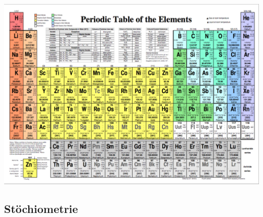 \documentclass[12pt,a4paper]{article}
\renewcommand{\=}[1]{\stackrel{#1}{=}}
\theoremstyle{definition}
\theoremstyle{remark}
\begin{document}
\includegraphics[width=0.9\textheight, angle=90]{pic/pse.png}
\newpage

\subsection{Stöchiometrie}
\end{document}
